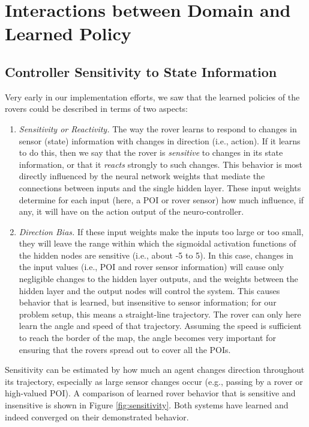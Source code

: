 \documentclass[letterpaper, 10 pt, conference]{ieeeconf}  %
\begin{document}
\section{Interactions between Domain and Learned Policy}
\subsection{Controller Sensitivity to State Information}
Very early in our implementation efforts, we saw that the learned policies of the rovers could be described in terms of two aspects:

\begin{enumerate}
\item \emph{Sensitivity or Reactivity.} The way the rover learns to respond to changes in sensor (state) information with changes in direction (i.e., action). If it learns to do this, then we say that the rover is \emph{sensitive} to changes in its state information, or that it \emph{reacts} strongly to such changes. This behavior is most directly influenced by the neural network weights that mediate the connections between inputs and the single hidden layer. These input weights determine for each input (here, a POI or rover sensor) how much influence, if any, it will have on the action output of the neuro-controller. 

\item \emph{Direction Bias.} If these input weights make the inputs too large or too small, they will leave the range within which the sigmoidal activation functions of the hidden nodes are sensitive (i.e., about -5 to 5). In this case, changes in the input values (i.e., POI and rover sensor information) will cause only negligible changes to the hidden layer outputs, and the weights between the hidden layer and the output nodes will control the system. This causes behavior that is learned, but insensitive to sensor information; for our problem setup, this means a straight-line trajectory. The rover can only here learn the angle and speed of that trajectory. Assuming the speed is sufficient to reach the border of the map, the angle becomes very important for ensuring that the rovers spread out to cover all the POIs. 
\end{enumerate}

Sensitivity can be estimated by how much an agent changes direction throughout its trajectory, especially as large sensor changes occur (e.g., passing by a rover or high-valued POI). A comparison of learned rover behavior that is sensitive and insensitive is shown in Figure \ref{fig:sensitivity}. Both systems have learned and indeed converged on their demonstrated behavior. 
\end{document}

